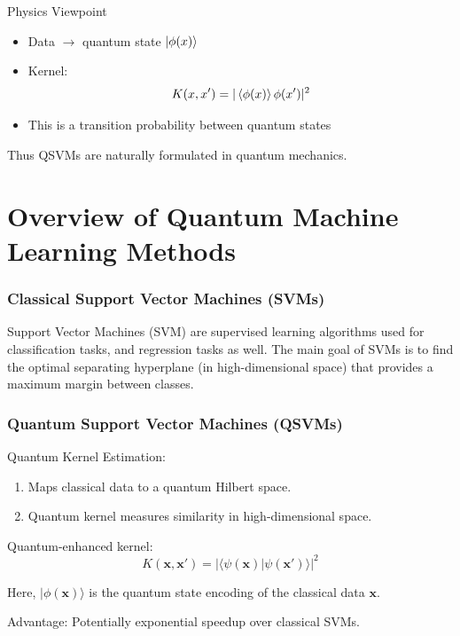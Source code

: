 \documentclass{beamer}
\begin{document}

\begin{frame}{Physics Viewpoint}
\begin{itemize}
\item Data $\rightarrow$ quantum state $\ket{\phi(x)}$
\item Kernel:
\[
K(x,x') = |\braket{\phi(x)}{\phi(x')}|^2
\]
\item This is a transition probability between quantum states
\end{itemize}

\medskip

Thus QSVMs are naturally formulated in quantum mechanics.
\end{frame}


\section{Overview of Quantum Machine Learning Methods}

\begin{frame}
\frametitle{Classical Support Vector Machines (SVMs)}

Support Vector Machines (SVM) are supervised learning algorithms used
for classification tasks, and regression tasks as well. The main goal
of SVMs is to find the optimal separating hyperplane (in
high-dimensional space) that provides a maximum margin between
classes.
\end{frame}

\begin{frame}
\frametitle{Quantum Support Vector Machines (QSVMs)}

\begin{block}{Quantum Kernel Estimation: }
\begin{enumerate}
\item Maps classical data to a quantum Hilbert space.

\item Quantum kernel measures similarity in high-dimensional space.
\end{enumerate}

\noindent
\end{block}

\begin{block}{Quantum-enhanced  kernel: }
\[
K(\bm{x}, \bm{x}') = |\langle \psi(\bm{x}) \vert  \psi(\bm{x}')\rangle|^2
\]
\end{block}

Here, $\vert \phi(\bm{x})\rangle$ is the quantum state encoding of
the classical data $\bm{x}$.

Advantage: Potentially exponential speedup over classical SVMs.
\end{frame}
\end{document}
